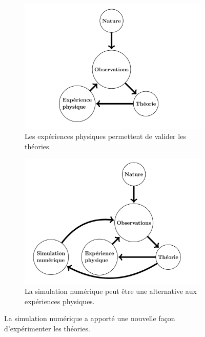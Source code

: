     
    \begin{figure}[b!]
        \centering
        \begin{subfigure}[t]{0.48\textwidth}
            \centering
            \includegraphics[width=\linewidth]{images/edl_simu_old.png}
            \caption{\label{fig:edl_simu_old}Les expériences physiques permettent de valider les théories.}
        \end{subfigure}\hfill
        \begin{subfigure}[t]{0.48\textwidth}
            \centering
            \includegraphics[width=\linewidth]{images/edl_simu_new.png}
            \caption{\label{fig:edl_simu_new}La simulation numérique peut être une alternative aux expériences physiques.}
        \end{subfigure}
        \caption{La simulation numérique a apporté une nouvelle façon d'expérimenter les théories.}
        \label{fig:tikz_simulation}
    \end{figure}
    


